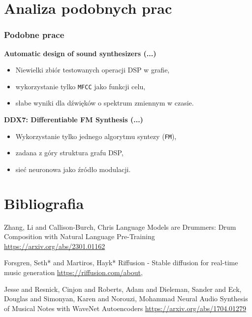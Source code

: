 \documentclass[]{beamer}
\begin{document}
\section{Analiza podobnych prac}
\begin{frame}
  \frametitle{Podobne prace}
  \begin{multicols}{2}
    \textbf{Automatic design of sound synthesizers (...) \cite{puredata}}
    \begin{itemize}
      \item Niewielki zbiór testowanych operacji DSP w grafie,
      \item wykorzystanie tylko \texttt{MFCC} jako funkcji celu,
      \item słabe wyniki dla dźwięków o spektrum zmiennym w czasie.
    \end{itemize}

    \textbf{DDX7: Differentiable FM Synthesis (...) \cite{ddx7}}
    \begin{itemize}
      \item Wykorzystanie tylko jednego algorytmu syntezy (\texttt{FM}),
      \item zadana z góry struktura grafu DSP,
      \item sieć neuronowa jako źródło modulacji.
    \end{itemize}
  \end{multicols}
\end{frame}


\section{Bibliografia}

\begin{frame}
  \begin{thebibliography}{99} %

   Zhang, Li and Callison-Burch, Chris
  \newblock Language Models are Drummers: Drum Composition with Natural Language Pre-Training
  \newblock \url{https://arxiv.org/abs/2301.01162}

   Forsgren, Seth* and Martiros, Hayk*
  \newblock Riffusion - Stable diffusion for real-time music generation
  \newblock \url{https://riffusion.com/about},

   Jesse and Resnick, Cinjon and Roberts, Adam and Dieleman, Sander and Eck, Douglas and Simonyan, Karen and Norouzi, Mohammad
  \newblock Neural Audio Synthesis of Musical Notes with WaveNet Autoencoders
  \newblock \url{https://arxiv.org/abs/1704.01279}

  \end{thebibliography}
\end{frame}
\end{document}
